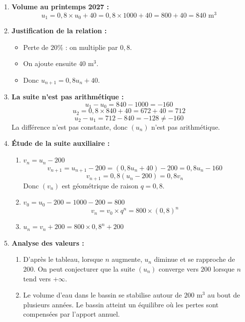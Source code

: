 \documentclass[a4paper,12pt]{article}
\begin{document}
\begin{enumerate}
\item \textbf{Volume au printemps 2027 :}
\[
u_1 = 0,8 \times u_0 + 40 = 0,8 \times 1000 + 40 = 800 + 40 = 840 \text{ m}^3
\]

\item \textbf{Justification de la relation :}
\begin{itemize}
\item Perte de $20\%$ : on multiplie par $0,8$.
\item On ajoute ensuite $40$ m$^3$.
\item Donc $u_{n+1} = 0,8 u_n + 40$.
\end{itemize}

\item \textbf{La suite n'est pas arithmétique :}
\[
u_1 - u_0 = 840 - 1000 = -160
\]
\[
u_2 = 0,8 \times 840 + 40 = 672 + 40 = 712
\]
\[
u_2 - u_1 = 712 - 840 = -128 \neq -160
\]
La différence n'est pas constante, donc $(u_n)$ n'est pas arithmétique.

\item \textbf{Étude de la suite auxiliaire :}
\begin{enumerate}
\item $v_n = u_n - 200$
\[
v_{n+1} = u_{n+1} - 200 = (0,8 u_n + 40) - 200 = 0,8 u_n - 160
\]
\[
v_{n+1} = 0,8(u_n - 200) = 0,8 v_n
\]
Donc $(v_n)$ est géométrique de raison $q = 0,8$.

\item $v_0 = u_0 - 200 = 1000 - 200 = 800$
\[
v_n = v_0 \times q^n = 800 \times (0,8)^n
\]

\item $u_n = v_n + 200 = 800 \times 0,8^n + 200$
\end{enumerate}

\item \textbf{Analyse des valeurs :}
\begin{enumerate}
\item D'après le tableau, lorsque $n$ augmente, $u_n$ diminue et se rapproche de $200$. On peut conjecturer que la suite $(u_n)$ converge vers $200$ lorsque $n$ tend vers $+\infty$.

\item Le volume d'eau dans le bassin se stabilise autour de $200$ m$^3$ au bout de plusieurs années. Le bassin atteint un équilibre où les pertes sont compensées par l'apport annuel.
\end{enumerate}
\end{enumerate}
\end{document}
